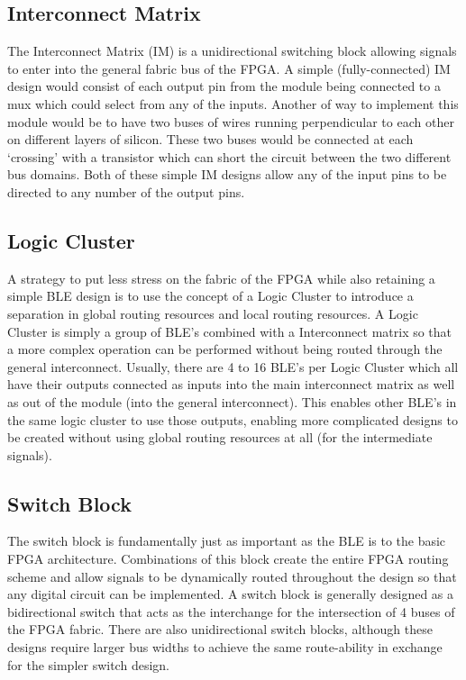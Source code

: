 \documentclass[12pt]{article}
\begin{document}
\subsection{Interconnect Matrix}
The Interconnect Matrix (IM) is a unidirectional switching block allowing signals 
to enter into the general fabric bus of the FPGA. A simple (fully-connected) IM design 
would consist of each output pin from the module being connected to a mux which could 
select from any of the inputs. Another of way to implement this module would be to 
have two buses of wires running perpendicular to each other on different layers of 
silicon. These two buses would be connected at each ‘crossing’ with a transistor 
which can short the circuit between the two different bus domains. Both of these 
simple IM designs allow any of the input pins to be directed to any number of the 
output pins.


\subsection{Logic Cluster}
A strategy to put less stress on the fabric of the FPGA while also retaining a simple 
BLE design is to use the concept of a Logic Cluster to introduce a separation in 
global routing resources and local routing resources. A Logic Cluster is simply a 
group of BLE’s combined with a Interconnect matrix so that a more complex operation 
can be performed without being routed through the general interconnect. Usually, 
there are 4 to 16 BLE’s per Logic Cluster which all have their outputs connected 
as inputs into the main interconnect matrix as well as out of the module (into the 
general interconnect). This enables other BLE’s in the same logic cluster to use 
those outputs, enabling more complicated designs to be created without using global 
routing resources at all (for the intermediate signals).

\subsection{Switch Block}
The switch block is fundamentally just as important as the BLE is to the basic FPGA 
architecture. Combinations of this block create the entire FPGA routing scheme and 
allow signals to be dynamically routed throughout the design so that any digital 
circuit can be implemented. A switch block is generally designed as a bidirectional 
switch that acts as the interchange for the intersection of 4 buses of the FPGA fabric.
There are also unidirectional switch blocks, although these designs require larger 
bus widths to achieve the same route-ability in exchange for the simpler switch design.
\end{document}
